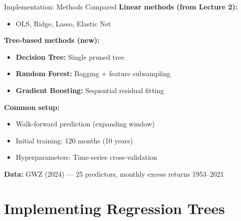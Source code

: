 \documentclass[10pt]{beamer}
\begin{document}

\begin{frame}{Implementation: Methods Compared}
  \textbf{Linear methods (from Lecture 2):}
  \begin{itemize}
    \item OLS, Ridge, Lasso, Elastic Net
  \end{itemize}

  \vspace{0.5em}
  \textbf{Tree-based methods (new):}
  \begin{itemize}
    \item \textbf{Decision Tree:} Single pruned tree
    \item \textbf{Random Forest:} Bagging + feature subsampling
    \item \textbf{Gradient Boosting:} Sequential residual fitting
  \end{itemize}

  \vspace{0.5em}
  \textbf{Common setup:}
  \begin{itemize}
    \item Walk-forward prediction (expanding window)
    \item Initial training: 120 months (10 years)
    \item Hyperparameters: Time-series cross-validation
  \end{itemize}

  \vspace{0.5em}
  \textbf{Data:} GWZ (2024) --- 25 predictors, monthly excess returns 1953--2021
\end{frame}

\section{Implementing Regression Trees}
\end{document}
